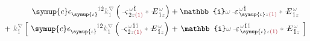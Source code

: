 \begin{subequations}
	\belowdisplayskip=8pt
\begin{align}
	{\symup{c}} \epsilon^{\hphantom{\symup{\iota}}\mathcolor{gray}{\dot{1}}\dot{2}}_{\symup{\iota}} \mathcolor{gray}{k^\nabla_{\dot{1}}} \left( \Xint{\begin{smallmatrix} ~ \\ {}^{}_{\mathcolor{gray}{-}} \\ ~ \end{smallmatrix}}{13}{\varsigma}^{\;\! \mathcolor{gray}{\omega} \hat{1}}_{\;\! \dot{2} \mathcolor{gray}{z} \textcolor{Maroon}{(1)}} \mathcolor{gray}{*} \Xint{\mathcolor{gray}{-}}{295}{E}^{\;\!\mathcolor{gray}{\omega}}_{\;\! \hat{1} \mathcolor{gray}{z}} \right) &+ \mathbb{i} \mathcolor{gray}{\omega} \Xint{\begin{smallmatrix} ~ \\ {}^{}_{\mathcolor{gray}{-}} \\ ~ \end{smallmatrix}}{16}{\varepsilon}^{\;\! \mathcolor{gray}{\omega} \hat{1}}_{\;\! \symup{\iota} \mathcolor{gray}{z} \textcolor{Maroon}{(1)}} \mathcolor{gray}{*} \Xint{\mathcolor{gray}{-}}{295}{E}^{\;\!\mathcolor{gray}{\omega}}_{\;\! \hat{1} \mathcolor{gray}{z}}  \label{eq:nonlinear(2)-wave_wkrho} \\ 
	+~ \mathcolor{gray}{k^\nabla_{\check{1}}} \left[~ {\symup{c}} \epsilon^{\hphantom{\symup{\iota}}\mathcolor{gray}{\dot{1}}\dot{2}}_{\symup{\iota}} \mathcolor{gray}{k^\nabla_{\dot{1}}} \left( \Xint{\begin{smallmatrix} ~ \\ {}^{}_{\mathcolor{gray}{-}} \\ ~ \end{smallmatrix}}{13}{\varsigma}^{\;\! \mathcolor{gray}{\omega} \hat{1} \mathcolor{gray}{\check{1}}}_{\;\! \dot{2} \mathcolor{gray}{z} \textcolor{Maroon}{(1)}} \mathcolor{gray}{*} \Xint{\mathcolor{gray}{-}}{295}{E}^{\;\!\mathcolor{gray}{\omega}}_{\;\! \hat{1} \mathcolor{gray}{z}} \right) \right.&+ \left.\mathbb{i} \mathcolor{gray}{\omega} \Xint{\begin{smallmatrix} ~ \\ {}^{}_{\mathcolor{gray}{-}} \\ ~ \end{smallmatrix}}{16}{\varepsilon}^{\;\! \mathcolor{gray}{\omega} \hat{1} \mathcolor{gray}{\check{1}}}_{\;\! \symup{\iota} \mathcolor{gray}{z} \textcolor{Maroon}{(1)}} \mathcolor{gray}{*} \Xint{\mathcolor{gray}{-}}{295}{E}^{\;\!\mathcolor{gray}{\omega}}_{\;\! \hat{1} \mathcolor{gray}{z}} ~\right] \\ 

\end{align}
\end{subequations}
